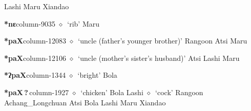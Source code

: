          Lashi 
\hspace{1ex}
         Maru 
\hspace{1ex}
         Xiandao 
  \item {\footnotesize \textbf{*nɛ}}{\tiny column-9035}
         $\diamond$~`rib'
         Maru 
  \item {\footnotesize \textbf{*paX}}{\tiny column-12083}
         $\diamond$~`uncle (father's younger brother)'
         Rangoon 
\hspace{1ex}
         Atsi 
\hspace{1ex}
         Maru 
  \item {\footnotesize \textbf{*paX}}{\tiny column-12106}
         $\diamond$~`uncle (mother's sister's husband)'
         Atsi 
\hspace{1ex}
         Lashi 
\hspace{1ex}
         Maru 
  \item {\footnotesize \textbf{*ʔpaX}}{\tiny column-1344}
         $\diamond$~`bright'
         Bola 
  \item {\footnotesize \textbf{*paX\,?\,}}{\tiny column-1927}
         $\diamond$~`chicken'
         Bola 
\hspace{1ex}
         Lashi 
\hspace{1ex}
         $\diamond$~`cock'
         Rangoon 
\hspace{1ex}
         Achang\_Longchuan 
\hspace{1ex}
         Atsi 
\hspace{1ex}
         Bola 
\hspace{1ex}
         Lashi 
\hspace{1ex}
         Maru 
\hspace{1ex}
         Xiandao 
\hspace{1ex}

